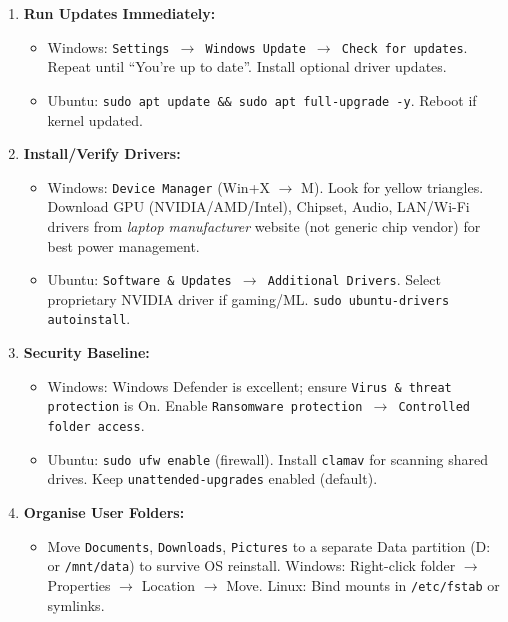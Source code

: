 \documentclass[11pt]{article}
\begin{document}
\begin{methode}
\begin{enumerate}
    \item \textbf{Run Updates Immediately:}
        \begin{itemize}
            \item Windows: \texttt{Settings $\rightarrow$ Windows Update $\rightarrow$ Check for updates}. Repeat until ``You're up to date''. Install optional driver updates.
            \item Ubuntu: \texttt{sudo apt update \&\& sudo apt full-upgrade -y}. Reboot if kernel updated.
        \end{itemize}
    \item \textbf{Install/Verify Drivers:}
        \begin{itemize}
            \item Windows: \texttt{Device Manager} (Win+X $\rightarrow$ M). Look for yellow triangles. Download GPU (NVIDIA/AMD/Intel), Chipset, Audio, LAN/Wi-Fi drivers from \emph{laptop manufacturer} website (not generic chip vendor) for best power management.
            \item Ubuntu: \texttt{Software \& Updates $\rightarrow$ Additional Drivers}. Select proprietary NVIDIA driver if gaming/ML. \texttt{sudo ubuntu-drivers autoinstall}.
        \end{itemize}
    \item \textbf{Security Baseline:}
        \begin{itemize}
            \item Windows: Windows Defender is excellent; ensure \texttt{Virus \& threat protection} is On. Enable \texttt{Ransomware protection $\rightarrow$ Controlled folder access}.
            \item Ubuntu: \texttt{sudo ufw enable} (firewall). Install \texttt{clamav} for scanning shared drives. Keep \texttt{unattended-upgrades} enabled (default).
        \end{itemize}
    \item \textbf{Organise User Folders:}
        \begin{itemize}
            \item Move \texttt{Documents}, \texttt{Downloads}, \texttt{Pictures} to a separate Data partition (D: or \texttt{/mnt/data}) to survive OS reinstall. Windows: Right-click folder $\rightarrow$ Properties $\rightarrow$ Location $\rightarrow$ Move. Linux: Bind mounts in \texttt{/etc/fstab} or symlinks.
        \end{itemize}

\end{enumerate}
\end{methode}
\end{document}
